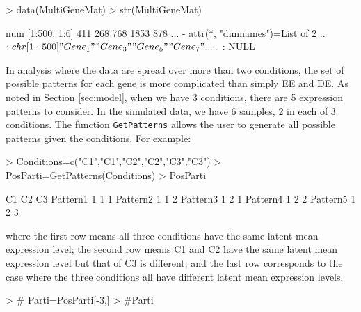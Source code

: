 \documentclass{article}
\begin{document}
\begin{Schunk}
\begin{Sinput}
> data(MultiGeneMat)
> str(MultiGeneMat)
\end{Sinput}
\begin{Soutput}
 num [1:500, 1:6] 411 268 768 1853 878 ...
 - attr(*, "dimnames")=List of 2
  ..$ : chr [1:500] "Gene_1" "Gene_3" "Gene_5" "Gene_7" ...
  ..$ : NULL
\end{Soutput}
\end{Schunk}
In analysis where the data are spread over more than two conditions,
the set of possible patterns for each gene is more complicated
than simply EE and DE. As noted in Section \ref{sec:model}, when we have 3 conditions, there are 5 expression
patterns to consider. In the simulated data, we have 6 samples, 2 in each of 3 conditions.
The function \verb+GetPatterns+ allows the user to generate all possible patterns given the conditions. For example:

\begin{Schunk}
\begin{Sinput}
> Conditions=c("C1","C1","C2","C2","C3","C3")
> PosParti=GetPatterns(Conditions)
> PosParti
\end{Sinput}
\begin{Soutput}
         C1 C2 C3
Pattern1  1  1  1
Pattern2  1  1  2
Pattern3  1  2  1
Pattern4  1  2  2
Pattern5  1  2  3
\end{Soutput}
\end{Schunk}

\noindent where the first row means all three conditions have the same latent mean expression level; 
the second row means C1 and C2 have the same latent mean expression level but that of C3 is different; 
and the last row corresponds to the case where the three conditions all have different latent mean expression levels.
\begin{Schunk}
\begin{Sinput}
> # Parti=PosParti[-3,]
> #Parti
\end{Sinput}
\end{Schunk}
\end{document}
